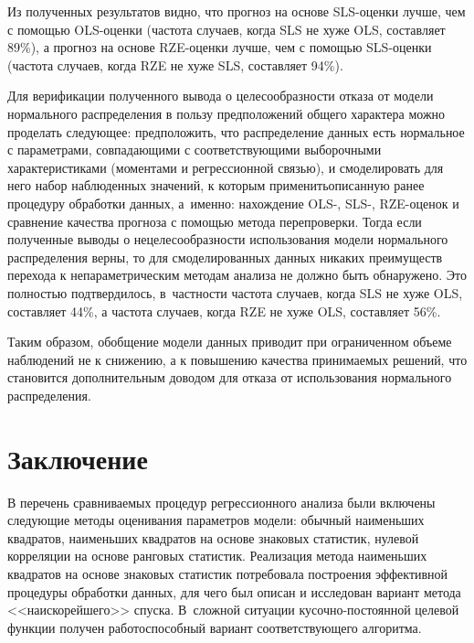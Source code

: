 \begin{multicols}{2}
{}



Из полученных результатов видно, что прогноз на основе SLS-оцен\-ки лучше,
чем с помощью OLS-оцен\-ки (частота случаев, когда SLS не хуже OLS,
составляет 89\%), а прогноз на основе RZE-оцен\-ки лучше, чем с помощью
SLS-оцен\-ки (частота случаев, когда RZE не хуже SLS, составляет 94\%).

     Для верификации полученного вывода о целесообразности отказа от
модели нормального распределения в пользу предположений общего харак\-тера
можно проделать следующее: предположить, что распределение данных есть
нормальное с па\-ра\-мет\-ра\-ми, совпадающими с соответствующими выборочными
характеристиками (моментами и регрессионной связью), и смоделировать для
него \mbox{набор}
 наблюденных значений, к которым при\-менить\linebreak описанную ранее
процедуру обработки данных, а~именно: нахождение OLS-, SLS-, \mbox{RZE-оце\-нок}
и сравнение качества прогноза с помощью метода перепроверки. Тогда если
полученные выводы
 о нецелесообразности использования модели нормального
распределения верны, то для смоделированных данных никаких преимуществ
перехода  к непараметрическим методам анализа не должно быть обнаружено.
Это полностью подтвердилось, в~част\-ности частота случаев, когда SLS не хуже
OLS, составляет 44\%, а частота случаев, когда RZE не хуже OLS, составляет
56\%.

     Таким образом, обобщение модели данных приводит при ограниченном
объеме наблюдений не к снижению, а к повышению качества принимаемых
решений, что становится дополнительным доводом для отказа от
использования нормального распределения.

\vspace*{-6pt}

\section{Заключение}

     В перечень сравниваемых процедур регрессионного анализа были
включены следующие методы оценивания параметров модели: обычный
наименьших квадратов, наименьших квадратов на основе знаковых статистик,
нулевой корреляции на основе ранговых статистик. Реализация метода
наименьших квадратов на основе знаковых статистик потребовала построения
эффективной процедуры обработки данных, для чего был описан и исследован
вариант метода <<наискорейшего>> спуска. В~сложной ситуации
     ку\-соч\-но-по\-сто\-ян\-ной целевой функции получен работоспособный
вариант соответствующего алгоритма.


\end{multicols}
